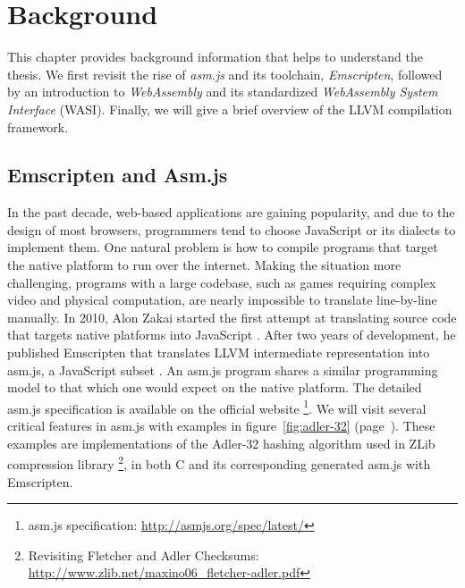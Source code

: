 \chapter{Background}
\label{chapter:background}

This chapter provides background information that helps to understand the
thesis. We first revisit the rise of \emph{asm.js} and its toolchain,
\emph{Emscripten},
followed by an introduction to \emph{WebAssembly} and its standardized
\emph{WebAssembly System Interface} (WASI). Finally, we will give a brief
overview of the LLVM compilation framework.

\section{Emscripten and Asm.js}

In the past decade, web-based applications are gaining popularity, and due to
the design of most browsers, programmers tend to choose JavaScript or its
dialects to implement them. One natural problem is how to compile programs that
target the native platform to run over the internet. Making the situation more
challenging, programs with a large codebase, such as games requiring
complex video and physical computation, are nearly impossible to translate
line-by-line manually. In 2010, Alon Zakai started the first attempt at
translating source code that targets native platforms into JavaScript
\cite{8118483}. After two years of development, he published Emscripten that
translates LLVM intermediate representation into asm.js, a JavaScript subset
\cite{10.1145/2048147.2048224}. An asm.js program shares a similar programming
model to that which one would expect on the native platform. The detailed asm.js
specification is available on the official website
\footnote{asm.js specification: \url{http://asmjs.org/spec/latest/}}.
We will visit several critical features in asm.js with examples in
figure~\ref{fig:adler-32} (page~\pageref{fig:adler-32}). These examples are
implementations of the Adler-32 hashing algorithm used in ZLib compression
library \cite{adler32-paper} \footnote{Revisiting Fletcher and Adler Checksums:
  \\\url{http://www.zlib.net/maxino06\_fletcher-adler.pdf}}, in both C and its
corresponding generated asm.js with Emscripten.


